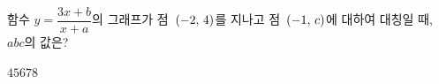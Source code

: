 \hspace*{2mm}\begin{minipage}[t]{\dimexpr\linewidth-2mm\relax}\vspace{0pt}
함수 $y=\dfrac{3x+b}{x+a}$의 그래프가 점~$(-2,\mkern3mu 4)$를 지나고 점~$(-1,\mkern3mu c)$에 대하여 대칭일 때, $abc$의 값은? 
\begin{choices32}{$4$}{$5$}{$6$}{$7$}{$8$}\end{choices32}\end{minipage}
